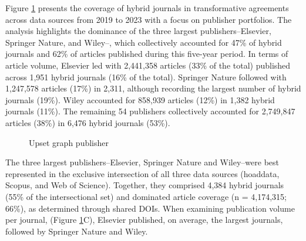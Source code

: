 \documentclass[a4paper,man,floatsintext,longtable,noextraspace,10pt]{apa6}
\begin{document}
Figure \ref{fig-upset_coverage_results_publisher} presents the coverage
of hybrid journals in transformative agreements across data sources from
2019 to 2023 with a focus on publisher portfolios. The analysis
highlights the dominance of the three largest publishers--Elsevier,
Springer Nature, and Wiley--, which collectively accounted for 47\% of
hybrid journals and 62\% of articles published during this five-year
period. In terms of article volume, Elsevier led with 2,441,358 articles
(33\% of the total) published across 1,951 hybrid journals (16\% of the
total). Springer Nature followed with 1,247,578 articles (17\%) in
2,311, although recording the largest number of hybrid journals (19\%).
Wiley accounted for 858,939 articles (12\%) in 1,382 hybrid journals
(11\%). The remaining 54 publishers collectively accounted for 2,749,847
articles (38\%) in 6,476 hybrid journals (53\%).

\begin{figure}[ht!]


\caption{\label{fig-upset_coverage_results_publisher}Upset graph
publisher}

\end{figure}%

The three largest publishers--Elsevier, Springer Nature and Wiley--were
best represented in the exclusive intersection of all three data sources
(hoaddata, Scopus, and Web of Science). Together, they comprised 4,384
hybrid journals (55\% of the intersectional set) and dominated article
coverage (n = 4,174,315; 66\%), as determined through shared DOIs. When
examining publication volume per journal, (Figure
\ref{fig-upset_coverage_results_publisher}C), Elsevier published, on
average, the largest journals, followed by Springer Nature and Wiley.
\end{document}

